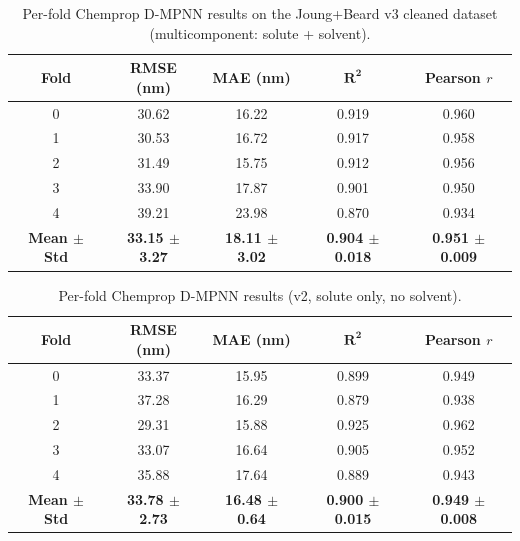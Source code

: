 \documentclass[journal=jcisd8,manuscript=suppinfo]{achemso}
\begin{document}
\begin{table}[htbp]
\centering
\caption{Per-fold Chemprop D-MPNN results on the Joung+Beard v3 cleaned dataset (multicomponent: solute + solvent).}
\label{tab:perfold_chemprop}
\begin{tabular}{ccccc}
\toprule
\textbf{Fold} & \textbf{RMSE (nm)} & \textbf{MAE (nm)} & $\boldsymbol{R^2}$ & \textbf{Pearson $r$} \\
\midrule
0 & 30.62 & 16.22 & 0.919 & 0.960 \\
1 & 30.53 & 16.72 & 0.917 & 0.958 \\
2 & 31.49 & 15.75 & 0.912 & 0.956 \\
3 & 33.90 & 17.87 & 0.901 & 0.950 \\
4 & 39.21 & 23.98 & 0.870 & 0.934 \\
\midrule
\textbf{Mean $\pm$ Std} & \textbf{33.15 $\pm$ 3.27} & \textbf{18.11 $\pm$ 3.02} & \textbf{0.904 $\pm$ 0.018} & \textbf{0.951 $\pm$ 0.009} \\
\bottomrule
\end{tabular}
\end{table}

\begin{table}[htbp]
\centering
\caption{Per-fold Chemprop D-MPNN results (v2, solute only, no solvent).}
\label{tab:perfold_chemprop_nosolvent}
\begin{tabular}{ccccc}
\toprule
\textbf{Fold} & \textbf{RMSE (nm)} & \textbf{MAE (nm)} & $\boldsymbol{R^2}$ & \textbf{Pearson $r$} \\
\midrule
0 & 33.37 & 15.95 & 0.899 & 0.949 \\
1 & 37.28 & 16.29 & 0.879 & 0.938 \\
2 & 29.31 & 15.88 & 0.925 & 0.962 \\
3 & 33.07 & 16.64 & 0.905 & 0.952 \\
4 & 35.88 & 17.64 & 0.889 & 0.943 \\
\midrule
\textbf{Mean $\pm$ Std} & \textbf{33.78 $\pm$ 2.73} & \textbf{16.48 $\pm$ 0.64} & \textbf{0.900 $\pm$ 0.015} & \textbf{0.949 $\pm$ 0.008} \\
\bottomrule
\end{tabular}
\end{table}
\end{document}
